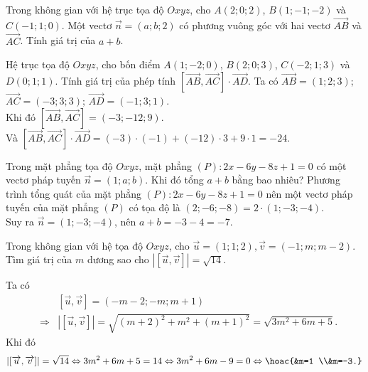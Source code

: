 \begin{ex}%
	Trong không gian với hệ trục tọa độ $Oxyz$, cho $A(2; 0; 2)$, $B(1;-1;-2)$ và $C(-1; 1; 0)$. Một vectơ $\overrightarrow{n}=(a; b; 2)$ có phương vuông góc với hai vectơ $\overrightarrow{AB}$ và $\overrightarrow{AC}$. Tính giá trị của $a+b$.
\end{ex}

\begin{ex}%
	Hệ trục tọa độ $Oxyz$, cho bốn điểm $A(1;-2; 0)$, $B(2; 0; 3)$, $C(-2; 1; 3)$ và $D(0; 1; 1)$. Tính giá trị của phép tính $\left[\overrightarrow{AB}, \overrightarrow{AC}\right] \cdot \overrightarrow{AD}$.
	\loigiai
	{
	Ta có $\overrightarrow{AB}=(1; 2; 3)$; $\overrightarrow{AC}=(-3; 3; 3)$; $\overrightarrow{A D}=(-1; 3; 1)$.\\
	Khi đó $\left[\overrightarrow{A B}, \overrightarrow{A C}\right]=(-3;-12; 9)$.\\
	Và $\left[\overrightarrow{A B}, \overrightarrow{A C}\right] \cdot \overrightarrow{A D}=(-3) \cdot(-1)+(-12) \cdot 3+9 \cdot 1=-24$.
	}
\end{ex}
\begin{ex}%
	Trong mặt phẳng tọa độ $O x y z$, mặt phẳng $(P)\colon 2 x-6 y-8 z+1=0$ có một vectơ pháp tuyến $\vec{n}=(1;a;b)$. Khi đó tổng $a+b$ bằng bao nhiêu? 
	\loigiai
	{
	Phương trình tổng quát của mặt phẳng $(P)\colon 2 x-6 y-8 z+1=0$ nên một vectơ pháp tuyến của mặt phẳng $(P)$ có tọa độ là $(2;-6;-8)=2\cdot (1;-3;-4)$.\\
	Suy ra $\vec{n}=(1;-3;-4)$, nên $a+b=-3-4=-7$.	
	}
\end{ex}

\begin{ex}%
	Trong không gian với hệ tọa độ $O x y z$, cho $\overrightarrow{u}=(1; 1; 2), \overrightarrow{v}=(-1; m; m-2)$. Tìm giá trị của $m$ dương sao cho $|[\overrightarrow{u}, \overrightarrow{v}]|=\sqrt{14}$.
	\loigiai
	{ Ta có {\allowdisplaybreaks
			\begin{eqnarray*}
			&& [\overrightarrow{u}, \overrightarrow{v}]=(-m-2;-m; m+1)\\ &\Rightarrow& |[\overrightarrow{u}, \overrightarrow{v}]|=\sqrt{(m+2)^2+m^2+(m+1)^2}=\sqrt{3 m^2+6 m+5}.
		\end{eqnarray*}}
	Khi đó $$|[\overrightarrow{u}, \overrightarrow{v}]|=\sqrt{14} \Leftrightarrow 3 m^2+6 m+5=14 \Leftrightarrow 3 m^2+6 m-9=0 \Leftrightarrow \hoac{&m=1 \\&m=-3.}$$
	
	}
\end{ex}

